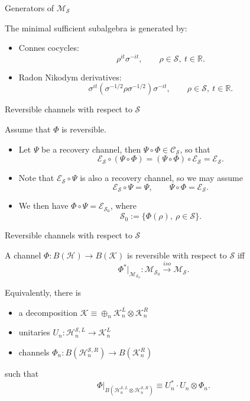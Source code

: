 \documentclass[mathserif]{beamer}
\newcommand{\<}{\langle}
\renewcommand{\>}{\rangle}
\newcommand{\Se}{\mathcal S}
\newcommand{\Ee}{\mathcal E}
\newcommand{\Me}{\mathcal M}
\newcommand{\Ce}{\mathcal C}
\newcommand{\Ha}{\mathcal H}
\newcommand{\Ka}{\mathcal K}
\begin{document}
\begin{frame}{Generators of $\Me_\Se$}


The minimal sufficient subalgebra is  generated by:
\medskip

\begin{itemize}
\item Connes cocycles:
\[
\rho^{it}\sigma^{-it}, \qquad \rho\in \Se, \ t\in \mathbb R.
\]
\item Radon Nikodym derivatives: 
\[
\sigma^{it}(\sigma^{-1/2}\rho\sigma^{-1/2})\sigma^{-it},\qquad  \rho\in \Se, \ t\in \mathbb R.
\]
\end{itemize}

\end{frame}




\begin{frame}{Reversible channels with respect to $\Se$}

Assume that $\Phi$ is reversible.
\medskip

\begin{itemize}
\item Let $\Psi$ be a recovery channel, then $\Psi\circ\Phi\in \Ce_\Se$, so that 
\[
\Ee_\Se\circ
(\Psi\circ\Phi)=(\Psi\circ\Phi)\circ\Ee_\Se=\Ee_\Se.
\]
\item Note that $\Ee_\Se\circ\Psi$ is also a recovery channel, so we may assume 
\[
\Ee_\Se\circ \Psi=\Psi,\qquad \Psi\circ \Phi=\Ee_\Se.
\]
\item We then have  $\Phi\circ\Psi=\Ee_{\Se_0}$, where
\[
\Se_0:=\{\Phi(\rho),\ \rho\in \Se\}.
\]



\end{itemize}

\end{frame}



\begin{frame}{Reversible channels with respect to $\Se$}


A channel $\Phi: B(\Ha)\to B(\Ka)$ is reversible with respect to $\Se$ iff 
\[
\Phi^*|_{\Me_{\Se_0}}: \Me_{\Se_0} \xrightarrow{iso}\Me_\Se.
\]


Equivalently, there is 
\medskip

\begin{itemize}
\item a decomposition $\Ka\equiv \oplus_n \Ka_n^L\otimes \Ka_n^R$


\item  unitaries $U_n: \Ha_n^{\Se,L}\to \Ka_n^L$

\item channels  $\Phi_n:B(\Ha^{\Se,R}_n)\to B(\Ka_n^R)$ 

\end{itemize}
\medskip

such that 
\[
\Phi|_{B(\Ha_n^{\Se,L}\otimes \Ha_n^{\Se,R})}\equiv U_n^* \cdot U_n\otimes \Phi_n.
\]



\end{frame}
\end{document}
